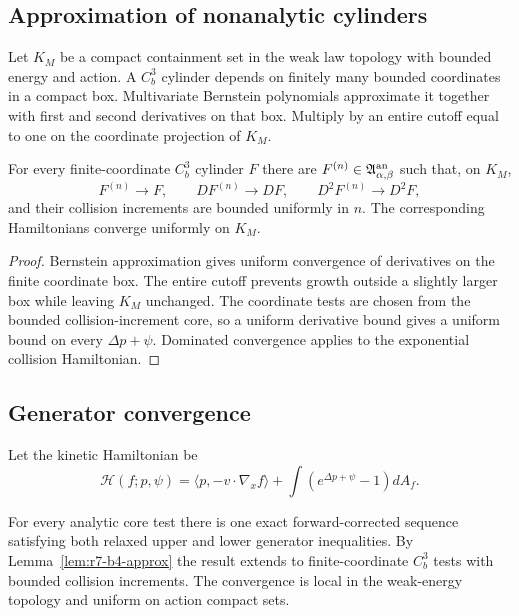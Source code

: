 \subsection{Approximation of nonanalytic cylinders}

Let $K_M$ be a compact containment set in the weak law topology with bounded
energy and action.  A $C_b^3$ cylinder depends on finitely many bounded
coordinates in a compact box.  Multivariate Bernstein polynomials approximate
it together with first and second derivatives on that box.  Multiply by an
entire cutoff equal to one on the coordinate projection of $K_M$.

\begin{lemma}
\label{lem:r7-b4-approx}
For every finite-coordinate $C_b^3$ cylinder $F$ there are
$F^{(n)}\in\mathfrak A_{\alpha,\beta}^{\rm an}$ such that, on $K_M$,
\[
 F^{(n)}\to F,
 \qquad DF^{(n)}\to DF,
 \qquad D^2F^{(n)}\to D^2F,
\]
and their collision increments are bounded uniformly in $n$.  The corresponding
Hamiltonians converge uniformly on $K_M$.
\end{lemma}

\begin{proof}
Bernstein approximation gives uniform convergence of derivatives on the
finite coordinate box.  The entire cutoff prevents growth outside a slightly
larger box while leaving $K_M$ unchanged.  The coordinate tests are chosen
from the bounded collision-increment core, so a uniform derivative bound gives
a uniform bound on every $\Delta p+\psi$.  Dominated convergence applies to the
exponential collision Hamiltonian.
\end{proof}

\subsection{Generator convergence}

Let the kinetic Hamiltonian be
\[
 \mathcal H(f;p,\psi)=
 \langle p,-v\cdot\nabla_xf\rangle
 +\int\left(e^{\Delta p+\psi}-1\right)dA_f.
\]

\begin{theorem}
\label{thm:r7-b4-generator}
For every analytic core test there is one exact forward-corrected sequence
satisfying both relaxed upper and lower generator inequalities.  By
Lemma~\ref{lem:r7-b4-approx} the result extends to finite-coordinate $C_b^3$
tests with bounded collision increments.  The convergence is local in the
weak-energy topology and uniform on action compact sets.
\end{theorem}

